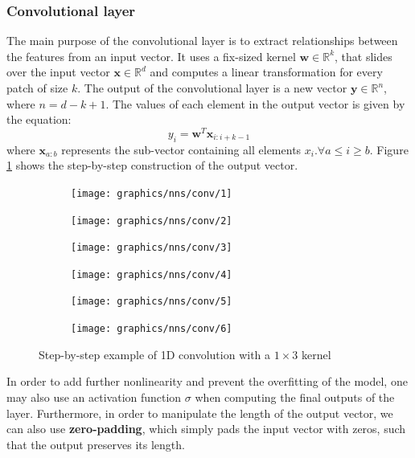 	\subsubsection*{Convolutional layer}
	The main purpose of the convolutional layer is to extract relationships between the features from an input vector. It uses a fix-sized kernel $\mathbf{w} \in \mathbb{R}^k$, that slides over the input vector $\mathbf{x}\in\mathbb{R}^d$ and computes a linear transformation for every patch of size $k$. The output of the convolutional layer is a new vector $\mathbf{y}\in\mathbb{R}^n$, where $n=d - k + 1$. The values of each element in the output vector is given by the equation:
	\begin{equation}
		y_i = \mathbf{w}^T\mathbf{x}_{i:i+k-1}
	\end{equation}
	where $\mathbf{x}_{a:b}$ represents the sub-vector containing all elements $x_i. \forall a\leq i \geq b$. Figure \ref{Fig: prep/ml/cnn/convoLayer} shows the step-by-step construction of the output vector.
	\begin{figure}[H]
		\centering
		\begin{subfigure}[b]{0.3\linewidth}
			\texttt{[image: graphics/nns/conv/1]}
			\vspace*{1cm}
		\end{subfigure}
		\begin{subfigure}[b]{0.3\linewidth}
			\texttt{[image: graphics/nns/conv/2]}
			\vspace*{1cm}
		\end{subfigure}
		\begin{subfigure}[b]{0.3\linewidth}
			\texttt{[image: graphics/nns/conv/3]}
			\vspace*{1cm}
		\end{subfigure}
		\begin{subfigure}[b]{0.3\linewidth}
			\texttt{[image: graphics/nns/conv/4]}
		\end{subfigure}
		\begin{subfigure}[b]{0.3\linewidth}
			\texttt{[image: graphics/nns/conv/5]}
		\end{subfigure}
		\begin{subfigure}[b]{0.3\linewidth}
			\texttt{[image: graphics/nns/conv/6]}
		\end{subfigure}
		\caption[1D Convolution]{Step-by-step example of 1D convolution with a $1\times3$ kernel}
		\label{Fig: prep/ml/cnn/convoLayer}
	\end{figure}
	In order to add further nonlinearity and prevent the overfitting of the model, one may also use an activation function $\sigma$ when computing the final outputs of the layer. Furthermore, in order to manipulate the length of the output vector, we can also use \textbf{zero-padding}, which simply pads the input vector with zeros, such that the output preserves its length.
